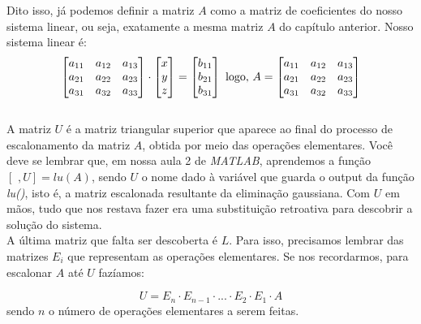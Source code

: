 \documentclass[12pt]{article}
\begin{document}
Dito isso, já podemos definir a matriz $A$ como a matriz de coeficientes do nosso sistema linear, ou seja, exatamente a mesma matriz $A$ do capítulo anterior. Nosso sistema linear é:\\
\begin{equation*}
	\begin{bmatrix}
		a_{11} & a_{12} & a_{13}\\
		a_{21} & a_{22} & a_{23}\\
		a_{31} & a_{32} & a_{33}
	\end{bmatrix} \cdot
	\begin{bmatrix}
		x\\ y\\z
	\end{bmatrix}=
	\begin{bmatrix}
		b_{11} \\ b_{21} \\ b_{31}
	\end{bmatrix} \mbox{ logo, } \newline
	A=\begin{bmatrix}
		a_{11} & a_{12} & a_{13}\\
		a_{21} & a_{22} & a_{23}\\
		a_{31} & a_{32} & a_{33}
	\end{bmatrix}
\end{equation*}\\

A matriz $U$ é a matriz triangular superior que aparece ao final do processo de escalonamento da matriz $A$, obtida por meio das operações elementares. Você deve se lembrar que, em nossa aula 2 de \textit{MATLAB}, aprendemos a função $[\mbox{~},U]=lu(A)$, sendo $U$ o nome dado à variável que guarda o output da função \textit{lu()}, isto é, a matriz escalonada resultante da eliminação gaussiana. Com $U$ em mãos, tudo que nos restava fazer era uma substituição retroativa para descobrir a solução do sistema. \\

A última matriz que falta ser descoberta é $L$. Para isso, precisamos lembrar das matrizes $E_i$ que representam as operações elementares. Se nos recordarmos, para escalonar $A$ até $U$ fazíamos:

\begin{equation*}
	U=E_n\cdot E_{n-1} \cdot ... \cdot E_2\cdot E_1\cdot A
\end{equation*}	
sendo $n$ o número de operações elementares a serem feitas. \\
\end{document}
